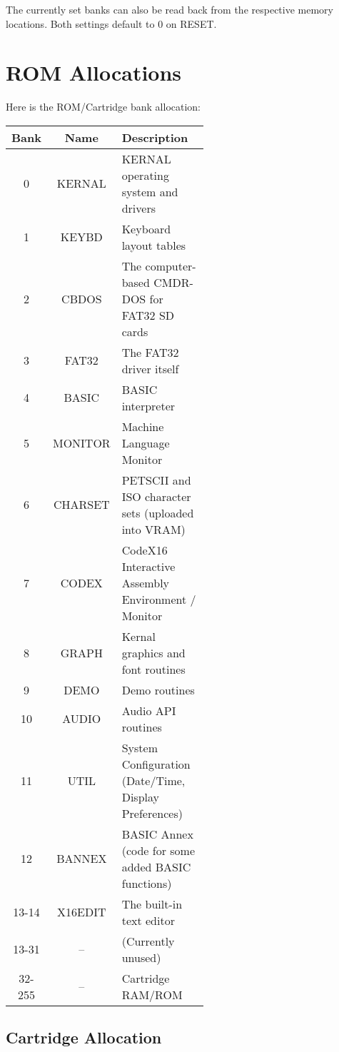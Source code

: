 The currently set banks can also be read back from the respective memory locations. Both settings default to 0 on RESET.\\

\section{ROM Allocations}

Here is the ROM/Cartridge bank allocation:\\

\begin{tabular}{|c|c|p{0.55\linewidth}|}
	\hline
	Bank   & Name    & Description\\ \hline
	0      & KERNAL  & KERNAL operating system and drivers\\ \hline
	1      & KEYBD   & Keyboard layout tables\\ \hline
	2      & CBDOS   & The computer-based CMDR-DOS for FAT32 SD cards\\ \hline
	3      & FAT32   & The FAT32 driver itself\\ \hline
	4      & BASIC   & BASIC interpreter\\ \hline
	5      & MONITOR & Machine Language Monitor\\ \hline
	6      & CHARSET & PETSCII and ISO character sets (uploaded into VRAM)\\ \hline
	7      & CODEX   & CodeX16 Interactive Assembly Environment / Monitor\\ \hline
	8      & GRAPH   & Kernal graphics and font routines\\ \hline
	9      & DEMO    & Demo routines\\ \hline
	10     & AUDIO   & Audio API routines\\ \hline
	11     & UTIL    & System Configuration (Date/Time, Display Preferences)\\ \hline
	12     & BANNEX  & BASIC Annex (code for some added BASIC functions)\\ \hline
	13-14  & X16EDIT & The built-in text editor\\ \hline
	13-31  & –       & (Currently unused)\\ \hline
	32-255 & –       & Cartridge RAM/ROM\\ \hline
\end{tabular}

\vspace{16pt}

\subsection{Cartridge Allocation}

